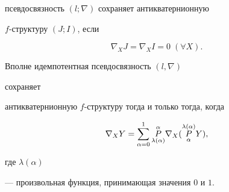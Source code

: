 псевдосвязность $(l;\nabla)$ сохраняет антикватернионную


$f$-структуру $(J;I)$, если


\begin{equation}


\nabla_X J=\nabla_X I=0 \;(\forall X).


\end{equation}





\begin{lemnonum} Вполне идемпотентная псевдосвязность $(l,\nabla)$


сохраняет


антикватернионную $f$-структуру тогда и только тогда, когда


\begin{equation}


\nabla_X Y=\sum^1_{\alpha=0}


\updown{\alpha}{\lambda(\alpha)}{P}\nabla_X


(\updown{\lambda(\alpha)}{\alpha}{P}Y),


\end{equation}


где $\lambda(\alpha)$


--- произвольная функция, принимающая значения $0$ и $1$.


\end{lemnonum}





